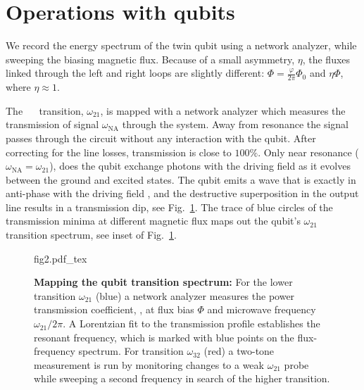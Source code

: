 
\section{Operations with qubits}
\label{sec:characterisation}


\noindent  We record  the energy  spectrum  of the  twin qubit  using a  network
analyzer,  while  sweeping  the  biasing  magnetic flux.   Because  of  a  small
asymmetry, $\eta$, the fluxes linked through  the left and right loops are slightly
different: $ \Phi = \frac{\varphi}{2\pi}\Phi_0$ and $ \eta\Phi $, where $\eta\approx1$.

The  ~\ilra~  transition, $\omega_{21}$,  is  mapped  with a  network
analyzer which measures  the transmission of signal  $\omega_{\text{NA}}$ through the
system.  Away from  resonance the signal passes through the  circuit without any
interaction with the qubit.  After  correcting for the line losses, transmission
is close to  $ 100\% $.  Only near resonance  ($\omega_{\text{NA}}=\omega_{21}$), does the
qubit exchange photons  with the driving field as it  evolves between the ground
and excited states.  The  qubit emits a wave that is  exactly in anti-phase with
the driving  field \cite{abdumalikov2010}, and the  destructive superposition in
the output line results in  a transmission dip, see Fig.~\ref{fig:transmission}.
The trace of blue circles of  the transmission minima at different magnetic flux
maps   out   the   qubit's   $\omega_{21}$  transition   spectrum,   see   inset   of
Fig.~\ref{fig:transmission}.

\begin{figure}[h]
  \centering\def\svgwidth{9.5cm}{fig2.pdf_tex}
  \caption{\small \textbf{Mapping  the qubit transition  spectrum:}  For the  lower transition
    $\omega_{21}$ (blue) a  network analyzer measures  the power  transmission coefficient,
    , at flux  bias $ \Phi $  and microwave frequency $  \omega_{21}/2\pi$.  A Lorentzian
    fit \cite{Astafiev2010}  to the transmission  profile establishes the  resonant frequency,
    which  is  marked  with  blue  points on  the  flux-frequency  spectrum.   For  transition
    $\omega_{32}$  (red)  a two-tone  measurement is  run by  monitoring changes  to a  weak
    $\omega_{21}$ probe while sweeping a second frequency  in search of the higher transition.
  }
  \label{fig:transmission}
\end{figure}

